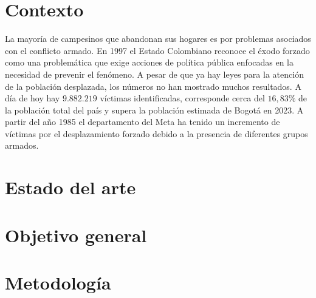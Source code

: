 \documentclass{article}
\begin{document}
\section{Contexto}

La mayoría de campesinos que abandonan sus hogares es por problemas asociados con el conflicto armado. En 1997 el Estado Colombiano reconoce el éxodo forzado como una problemática que exige acciones de política pública enfocadas en la necesidad de prevenir el fenómeno\cite{villa2006desplazamiento}. A pesar de que ya hay leyes para la atención de la población desplazada, los números no han mostrado muchos resultados. A día de hoy hay $9.882.219$ víctimas identificadas\cite{unidadvictimas_ruv_2025}, corresponde cerca del $16,83 \%$ de la población total del país\cite{eswiki:165709323} y supera la población estimada de Bogotá en 2023\cite{eswiki:165573820}. A partir del año 1985 el departamento del Meta ha tenido un incremento de víctimas por el desplazamiento forzado debido a la presencia de diferentes grupos armados\cite{solano2020determinantes}.


\section{Estado del arte}

\section{Objetivo general}

\section{Metodología}




\end{document}
